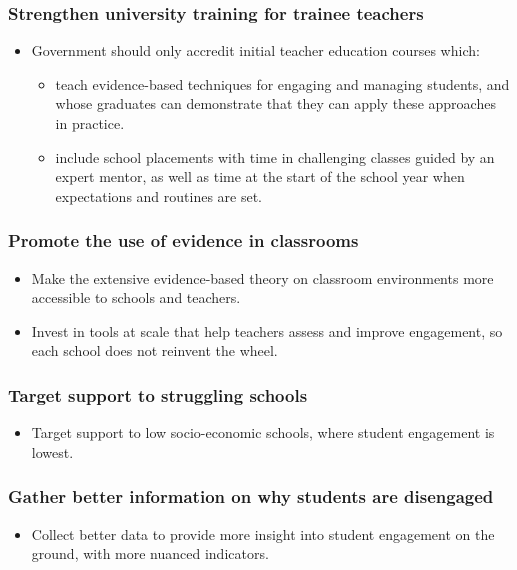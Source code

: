 \documentclass{grattan}
\begin{document}
\begin{recommendations}
\vfill
\columnbreak  %

\label{rec:recommendation-2-system-level}
\subsubsection{Strengthen university training for trainee teachers}\label{subsubsec:ITEs-make-classroom-environment-priority}
\begin{itemize}
    \item Government should only accredit initial teacher education courses which:
    \begin{itemize}
        \item teach evidence-based techniques for engaging and managing students, and whose graduates can demonstrate that they can apply these approaches in practice.
        \item include school placements with time in challenging classes guided by an expert mentor, as well as time at the start of the school year when expectations and routines are set.
    \end{itemize}
\end{itemize}
\subsubsection{Promote the use of evidence in classrooms}\label{subsubsec:promote-use-evidence}
\begin{itemize}
    \item Make the extensive evidence-based theory on classroom environments more accessible to schools and teachers.
    \item Invest in tools at scale that help teachers assess and improve engagement, so each school does not reinvent the wheel.
\end{itemize}

\subsubsection{Target support to struggling schools}\label{subsubsec:target-support-struggling-schools}
\begin{itemize}
    \item Target support to low socio-economic schools, where student engagement is lowest.
\end{itemize}

\subsubsection{Gather better information on why students are disengaged }\label{subsubsec:gather-better-information}
\begin{itemize}
    \item Collect better data to provide more insight into student engagement on the ground, with more nuanced indicators.

\end{itemize}

\end{recommendations}
\end{document}
